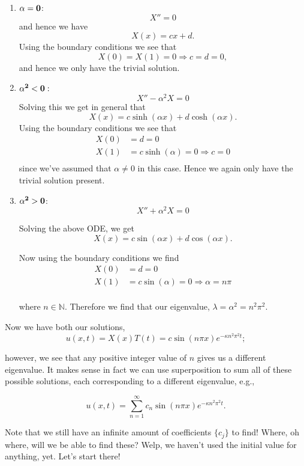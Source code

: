 \begin{itemize}
\begin{itemize}
\begin{enumerate}
\item ${\bf{\alpha=0}}$: $$X'' = 0$$
and hence we have $$X(x) = cx+d.$$
Using the boundary conditions we see that $$X(0)=X(1)=0 \Rightarrow c=d=0,$$
and hence we only have the trivial solution.\\

\item ${\bf{\alpha^2 <0}}:$ $$X'' - \alpha^2 X = 0$$
Solving this we get in general that $$X(x) = c\sinh(\alpha x) + d\cosh(\alpha x).$$
Using the boundary conditions we see that 
\begin{align*}
X(0) &= d = 0\\
X(1) &= c\sinh(\alpha) = 0 \Rightarrow c = 0\\
\end{align*}
since we've assumed that $\alpha\neq0$ in this case. Hence we again only have the trivial solution present.\\

\item ${\bf{\alpha^2 > 0}}$: $$X'' + \alpha^2 X = 0$$

Solving the above ODE, we get $$X(x) = c\sin(\alpha x) + d\cos(\alpha x).$$

Now using the boundary conditions we find
\begin{align*}
X(0) &= d = 0 \\
X(1) &= c\sin(\alpha) = 0 \Rightarrow \alpha = n\pi \\
\end{align*}

where $n\in\mathbb{N}$. Therefore we find that our eigenvalue, $\lambda = \alpha^2 = n^2\pi^2.$ 

\end{enumerate}

\end{itemize}

Now we have both our solutions, $$u(x,t) = X(x)T(t) = c \sin(n\pi x) e^{-\kappa n^2 \pi^2 t};$$

however, we see that any positive integer value of $n$ gives us a different eigenvalue. It makes sense in fact we can use superposition to sum all of these possible solutions, each corresponding to a different eigenvalue, e.g.,

$$u(x,t) = \sum_{n=1}^{\infty} c_n  \sin(n\pi x) e^{-\kappa n^2 \pi^2 t}.$$

Note that we still have an infinite amount of coefficients $\{ c_j \}$ to find! Where, oh where, will we be able to find these? Welp, we haven't used the initial value for anything, yet. Let's start there!\\


\end{itemize}

